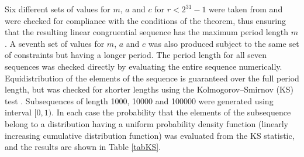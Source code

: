 \documentclass[dvips]{article}
\begin{document}
Six different sets of values for $m$,
$a$ and $c$ for $r < 2^{31}-1$ were taken from \cite{numrec} and were
checked for compliance with the conditions of the 
theorem, thus ensuring that the resulting linear
congruential sequence has the maximum period length $m$.
A seventh set of values for $m$, $a$ and $c$ was also produced subject to
the same set of constraints but having a longer period.
The period length for all seven sequences was checked directly by evaluating
the entire sequence numerically.  Equidistribution of the elements of
the sequence is guaranteed over the full period length, but was checked
for shorter lengths using the Kolmogorov--Smirnov (KS) test \cite{knuth,numrec}.
Subsequences of length 1000, 10000 and 100000 were generated using
interval $[0,1)$.  In each case the probability that the elements of the 
subsequence belong to a distribution having a uniform probability density
function (linearly increasing cumulative distribution function) was
evaluated from the KS statistic, and the results are shown in
Table \ref{tabKS}.
\end{document}
